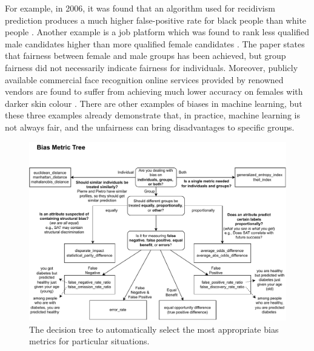 \documentclass[sigconf,review]{acmart}
\begin{document}
	For example, in 2006, it was found that an algorithm used for recidivism prediction produces a much higher false-positive rate for black people than white people \cite{angwin2016machine}. Another example is a job platform which was found to rank less qualified male candidates higher than more qualified female candidates \cite{lahoti2019ifair}. The paper states that fairness between female and male groups has been achieved, but group fairness did not necessarily indicate fairness for individuals. Moreover, publicly available commercial face recognition online services provided by renowned vendors are found to suffer from achieving much lower accuracy on females with darker skin colour \cite{buolamwini2018gender}. There are other examples of biases in machine learning, but these three examples already demonstrate that, in practice, machine learning is not always fair, and the unfairness can bring disadvantages to specific groups. 
	
	\begin{figure}[h]
		\includegraphics[width=\linewidth]{figures/wizard-metric}
		\caption{The decision tree to automatically select the most appropriate bias metrics for particular situations.}
		\label{fig:wizard-metric}
	\end{figure}
	
\end{document}
